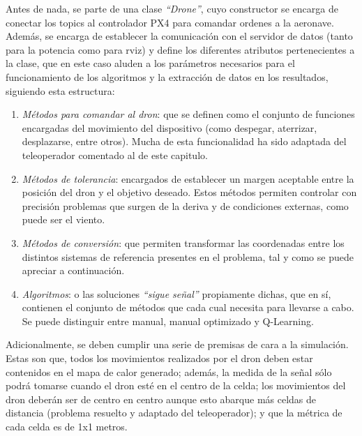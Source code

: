 Antes de nada, se parte de una clase \emph{``Drone''}, cuyo constructor se encarga de conectar los topics al controlador PX4 para comandar ordenes a la aeronave. Además, se encarga de establecer la comunicación con el servidor de datos (tanto para la potencia como para rviz) y define los diferentes atributos pertenecientes a la clase, que en este caso aluden a los parámetros necesarios para el funcionamiento de los algoritmos y la extracción de datos en los resultados, siguiendo esta estructura:

\begin{enumerate}
	\item \emph{Métodos para comandar al dron}: que se definen como el conjunto de funciones encargadas del movimiento del dispositivo (como despegar, aterrizar, desplazarse, entre otros). Mucha de esta funcionalidad ha sido adaptada del teleoperador comentado al de este capitulo.

    \item \emph{Métodos de tolerancia}: encargados de establecer un margen aceptable entre la posición del dron y el objetivo deseado. Estos métodos permiten controlar con precisión problemas que surgen de la deriva y de condiciones externas, como puede ser el viento.

	\item \emph{Métodos de conversión}: que permiten transformar las coordenadas entre los distintos sistemas de referencia presentes en el problema, tal y como se puede apreciar a continuación.

    \item \emph{Algoritmos}: o las soluciones \emph{``sigue señal''} propiamente dichas, que en sí, contienen el conjunto de métodos que cada cual necesita para llevarse a cabo. Se puede distinguir entre manual, manual optimizado y Q-Learning.
\end{enumerate}

Adicionalmente, se deben cumplir una serie de premisas de cara a la simulación. Estas son que, todos los movimientos realizados por el dron deben estar contenidos en el mapa de calor generado; además, la medida de la señal sólo podrá tomarse cuando el dron esté en el centro de la celda; los movimientos del dron deberán ser de centro en centro aunque esto abarque más celdas de distancia (problema resuelto y adaptado del teleoperador); y que la métrica de cada celda es de 1x1 metros.\\

